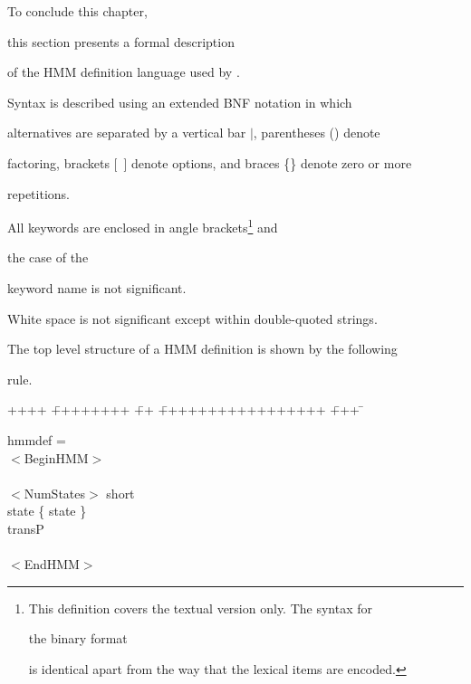 




To conclude this chapter,


this section presents a formal description


of the HMM definition language used by \HTK.


Syntax is described using an extended BNF notation in which


alternatives are separated by a vertical bar $|$, parentheses () denote


factoring, brackets [\ ] denote options, and braces \{\} denote zero or more


repetitions. 





All keywords are enclosed in angle brackets\footnote{


This definition covers the textual version only.  The syntax for


the binary format


is identical apart from the way that the lexical items are encoded.} and


the case of the


keyword name is not significant.


White space is not significant except within double-quoted strings.





The top level structure of a HMM definition is shown by the following


rule. 


{\sf


\begin{tabbing}


++++ \= ++++++++ \= ++ \= +++++++++++++++++ \= +++ \=  \kill


\>  hmmdef =  \\


\>\>         $<$BeginHMM$>$ \\


\>\>\>          [ globalOpts ] \\


\>\>\>          $<$NumStates$>$ short \\


\>\>\>          state \{ state \} \\


\>\>\>          transP \\


\>\>\>          [ duration ] \\


\>\>         $<$EndHMM$>$ 


\end{tabbing}


}


